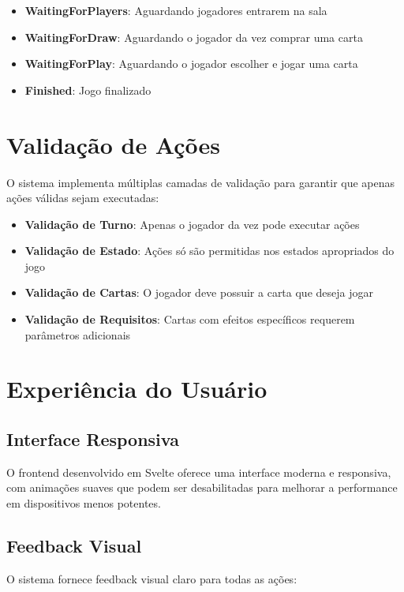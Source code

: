 \begin{itemize}
    \item \textbf{WaitingForPlayers}: Aguardando jogadores entrarem na sala
    \item \textbf{WaitingForDraw}: Aguardando o jogador da vez comprar uma carta
    \item \textbf{WaitingForPlay}: Aguardando o jogador escolher e jogar uma carta
    \item \textbf{Finished}: Jogo finalizado
\end{itemize}

\section{Validação de Ações}

O sistema implementa múltiplas camadas de validação para garantir que apenas ações válidas sejam executadas:

\begin{itemize}
    \item \textbf{Validação de Turno}: Apenas o jogador da vez pode executar ações
    \item \textbf{Validação de Estado}: Ações só são permitidas nos estados apropriados do jogo
    \item \textbf{Validação de Cartas}: O jogador deve possuir a carta que deseja jogar
    \item \textbf{Validação de Requisitos}: Cartas com efeitos específicos requerem parâmetros adicionais
\end{itemize}

\section{Experiência do Usuário}

\subsection{Interface Responsiva}
O frontend desenvolvido em Svelte oferece uma interface moderna e responsiva, com animações suaves que podem ser desabilitadas para melhorar a performance em dispositivos menos potentes.

\subsection{Feedback Visual}
O sistema fornece feedback visual claro para todas as ações:

